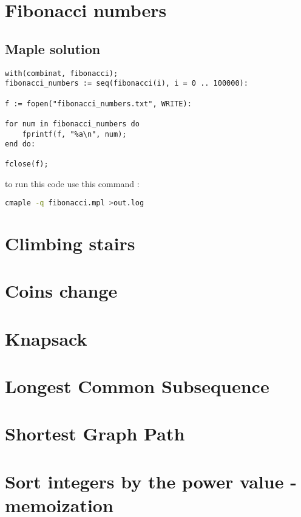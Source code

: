 \documentclass{article}
\begin{document}
\section{Fibonacci numbers}
\subsection{Maple solution}
\begin{lstlisting}[language=Maple]
with(combinat, fibonacci);
fibonacci_numbers := seq(fibonacci(i), i = 0 .. 100000):

f := fopen("fibonacci_numbers.txt", WRITE):

for num in fibonacci_numbers do
	fprintf(f, "%a\n", num);
end do:

fclose(f);
\end{lstlisting}

to run this code use this command :
\begin{lstlisting}[language=bash]
cmaple -q fibonacci.mpl >out.log
\end{lstlisting}


\section{Climbing stairs}

\section{Coins change}

\section{Knapsack}

\section{Longest Common Subsequence}

\section{Shortest Graph Path}

\section{Sort integers by the power value - memoization}
\end{document}
